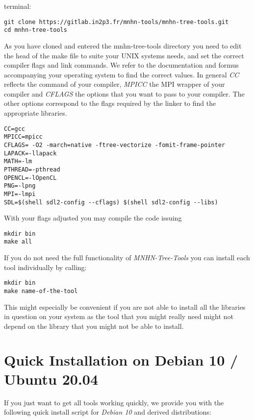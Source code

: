 terminal:
\begin{lstlisting}                                                              
git clone https://gitlab.in2p3.fr/mnhn-tools/mnhn-tree-tools.git
cd mnhn-tree-tools
\end{lstlisting}
As you have cloned and entered the mnhn-tree-tools
directory you need to edit the head of the
make file to suite your UNIX systems needs, and set the correct compiler
flags and link commands. We refer to the documentation and formus
accompanying your operating system to find the
correct values. In general \emph{CC} reflects the command of your compiler,
\emph{MPICC} the MPI wrapper of your compiler and \emph{CFLAGS} the
options that you want to pass to your compiler. The other options
correspond to the flags required by the linker to find the appropriate
libraries.
\begin{lstlisting}                                                           
CC=gcc
MPICC=mpicc
CFLAGS= -O2 -march=native -ftree-vectorize -fomit-frame-pointer 
LAPACK=-llapack
MATH=-lm
PTHREAD=-pthread
OPENCL=-lOpenCL
PNG=-lpng
MPI=-lmpi
SDL=$(shell sdl2-config --cflags) $(shell sdl2-config --libs)
\end{lstlisting}
With your flags adjusted you may compile the code issuing
\begin{lstlisting}
mkdir bin
make all
\end{lstlisting}
If you do not need the full functionality of \emph{MNHN-Tree-Tools} you can
install each tool individually by calling:
\begin{lstlisting}
mkdir bin
make name-of-the-tool
\end{lstlisting}
This might especially be convenient if you are not able to install all
the libraries in question on your system as the tool that you might
really need might not depend on the library that you might not be able
to install.

\section{Quick Installation on Debian 10 / Ubuntu 20.04}
If you just want to get all tools working quickly, we provide you with the
following quick install script for \emph{Debian 10} and derived distributions:


